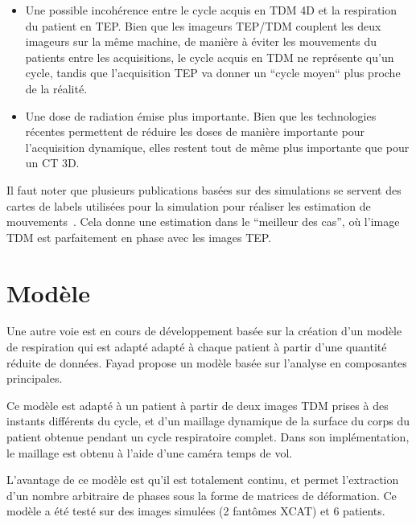 \begin{itemize}
 \item Une possible incohérence entre le cycle acquis en TDM 4D et la respiration du patient en TEP. Bien que les imageurs TEP/TDM couplent les deux imageurs sur la même machine, de manière à éviter les mouvements du patients entre les acquisitions, le cycle acquis en TDM ne représente qu'un cycle, tandis que l'acquisition TEP va donner un ``cycle moyen`` plus proche de la réalité.
 \item Une dose de radiation émise plus importante. Bien que les technologies récentes permettent de réduire les doses de manière importante pour l'acquisition dynamique, elles restent tout de même plus importante que pour un CT 3D.
\end{itemize}

Il faut noter que plusieurs publications basées sur des simulations se servent des cartes de labels utilisées pour la simulation pour réaliser les estimation de mouvements~\cite{lamare2007list}. Cela donne une estimation dans le ``meilleur des cas'', où l'image TDM est parfaitement en phase avec les images TEP.

\section{Modèle}

Une autre voie est en cours de développement basée sur la création d'un modèle de respiration qui est adapté adapté à chaque patient à partir d'une quantité réduite de données. Fayad \cite{fayad2010application} propose un modèle basée sur l'analyse en composantes principales. 

Ce modèle est adapté à un patient à partir de deux images TDM prises à des instants différents du cycle, et d'un maillage dynamique de la surface du corps du patient obtenue pendant un cycle respiratoire complet. Dans son implémentation, le maillage est obtenu à l'aide d'une caméra temps de vol.

L'avantage de ce modèle est qu'il est totalement continu, et permet l'extraction d'un nombre arbitraire de phases sous la forme de matrices de déformation. Ce modèle a été testé sur des images simulées (2 fantômes XCAT) et 6 patients.